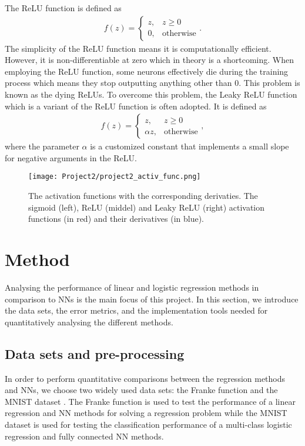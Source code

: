 \documentclass[a4paper]{article}
\begin{document}
The ReLU function is defined as 
\begin{align}
    f(z)=
    \begin{cases}
        z,  &  z \geq 0\\
        0,  & \text{otherwise}
    \end{cases}.
\end{align}
The simplicity of the ReLU function means it is computationally efficient. However, it is non-differentiable at zero which in theory is a shortcoming. When employing the ReLU function, some neurons effectively die during the training process which means they stop outputting anything other than 0. This problem is known as the dying ReLUs\cite{lec}. To overcome this problem, the Leaky ReLU function which is a variant of the ReLU function is often adopted. It is defined as 
\begin{align}
    f(z)=
    \begin{cases}
        z,  &  z \geq 0\\
        \alpha z,  & \text{otherwise}
    \end{cases},
\end{align}
where the parameter $\alpha$ is a customized constant that implements a small slope for negative arguments in the ReLU. 

\begin{figure}[H]
  \centering
  \texttt{[image: Project2/project2\_activ\_func.png]}
  \caption{The activation functions with the corresponding derivaties. The sigmoid (left), ReLU (middel) and Leaky ReLU (right) activation functions (in red) and their derivatives (in blue).}
    \label{activations}
\end{figure}

\section{Method}
Analysing the performance of linear and logistic regression methods in comparison to NNs is the main focus of this project. In this section, we introduce the data sets, the error metrics, and the implementation tools needed for quantitatively analysing the different methods.

\subsection{Data sets and pre-processing}
In order to perform quantitative comparisons between the regression methods and NNs, we choose two widely used data sets: the Franke function \cite{franke1979critical} and the MNIST dataset \cite{lecun-mnisthandwrittendigit-2010}. The Franke function is used to test the performance of a linear regression and NN methods for solving a regression problem while the MNIST dataset is used for testing the classification performance of a multi-class logistic regression and fully connected NN methods.
\end{document}
